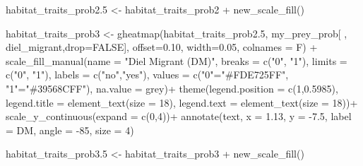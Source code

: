 \documentclass[
]{article}
\newenvironment{Shaded}{\begin{snugshade}}{\end{snugshade}}
\newcommand{\AttributeTok}[1]{\textcolor[rgb]{0.77,0.63,0.00}{#1}}
\newcommand{\ConstantTok}[1]{\textcolor[rgb]{0.00,0.00,0.00}{#1}}
\newcommand{\DecValTok}[1]{\textcolor[rgb]{0.00,0.00,0.81}{#1}}
\newcommand{\FloatTok}[1]{\textcolor[rgb]{0.00,0.00,0.81}{#1}}
\newcommand{\FunctionTok}[1]{\textcolor[rgb]{0.00,0.00,0.00}{#1}}
\newcommand{\NormalTok}[1]{#1}
\newcommand{\OtherTok}[1]{\textcolor[rgb]{0.56,0.35,0.01}{#1}}
\newcommand{\SpecialCharTok}[1]{\textcolor[rgb]{0.00,0.00,0.00}{#1}}
\newcommand{\StringTok}[1]{\textcolor[rgb]{0.31,0.60,0.02}{#1}}
\begin{document}
\begin{Shaded}
\begin{Highlighting}[]
\NormalTok{habitat\_traits\_prob2}\FloatTok{.5} \OtherTok{\textless{}{-}}\NormalTok{ habitat\_traits\_prob2 }\SpecialCharTok{+} \FunctionTok{new\_scale\_fill}\NormalTok{()}

\NormalTok{habitat\_traits\_prob3 }\OtherTok{\textless{}{-}} \FunctionTok{gheatmap}\NormalTok{(habitat\_traits\_prob2}\FloatTok{.5}\NormalTok{, my\_prey\_prob[ , }\StringTok{\textquotesingle{}diel\_migrant\textquotesingle{}}\NormalTok{,}\AttributeTok{drop=}\ConstantTok{FALSE}\NormalTok{], }\AttributeTok{offset=}\FloatTok{0.10}\NormalTok{, }\AttributeTok{width=}\FloatTok{0.05}\NormalTok{, }\AttributeTok{colnames =}\NormalTok{ F) }\SpecialCharTok{+}
  \FunctionTok{scale\_fill\_manual}\NormalTok{(}\AttributeTok{name =} \StringTok{"Diel Migrant (DM)"}\NormalTok{,}
                    \AttributeTok{breaks =} \FunctionTok{c}\NormalTok{(}\StringTok{"0"}\NormalTok{, }\StringTok{"1"}\NormalTok{),}
                    \AttributeTok{limits =} \FunctionTok{c}\NormalTok{(}\StringTok{"0"}\NormalTok{, }\StringTok{"1"}\NormalTok{),}
                    \AttributeTok{labels =} \FunctionTok{c}\NormalTok{(}\StringTok{"no"}\NormalTok{,}\StringTok{"yes"}\NormalTok{),}
                    \AttributeTok{values =} \FunctionTok{c}\NormalTok{(}\StringTok{"0"}\OtherTok{=}\StringTok{"\#FDE725FF"}\NormalTok{, }\StringTok{"1"}\OtherTok{=}\StringTok{"\#39568CFF"}\NormalTok{), }
                    \AttributeTok{na.value =} \StringTok{\textquotesingle{}grey\textquotesingle{}}\NormalTok{)}\SpecialCharTok{+}
  \FunctionTok{theme}\NormalTok{(}\AttributeTok{legend.position =} \FunctionTok{c}\NormalTok{(}\DecValTok{1}\NormalTok{,}\FloatTok{0.5985}\NormalTok{),}
        \AttributeTok{legend.title =} \FunctionTok{element\_text}\NormalTok{(}\AttributeTok{size =} \DecValTok{18}\NormalTok{), }
        \AttributeTok{legend.text =} \FunctionTok{element\_text}\NormalTok{(}\AttributeTok{size =} \DecValTok{18}\NormalTok{))}\SpecialCharTok{+}
  \FunctionTok{scale\_y\_continuous}\NormalTok{(}\AttributeTok{expand =} \FunctionTok{c}\NormalTok{(}\DecValTok{0}\NormalTok{,}\DecValTok{4}\NormalTok{))}\SpecialCharTok{+}
  \FunctionTok{annotate}\NormalTok{(}\StringTok{\textquotesingle{}text\textquotesingle{}}\NormalTok{, }\AttributeTok{x =} \FloatTok{1.13}\NormalTok{, }\AttributeTok{y =} \SpecialCharTok{{-}}\FloatTok{7.5}\NormalTok{, }\AttributeTok{label =} \StringTok{\textquotesingle{}DM\textquotesingle{}}\NormalTok{, }\AttributeTok{angle =} \SpecialCharTok{{-}}\DecValTok{85}\NormalTok{, }\AttributeTok{size =} \DecValTok{4}\NormalTok{)}

\NormalTok{habitat\_traits\_prob3}\FloatTok{.5} \OtherTok{\textless{}{-}}\NormalTok{ habitat\_traits\_prob3 }\SpecialCharTok{+} \FunctionTok{new\_scale\_fill}\NormalTok{()}


\end{Highlighting}
\end{Shaded}
\end{document}
